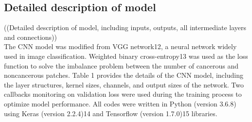 \subsection{Detailed description of model}
((Detailed description of model, including inputs, outputs, all intermediate layers and connections)) \\

The CNN model was modified from VGG network12, a neural network widely used in image classification. Weighted binary cross-entropy13 was used as the loss function to solve the  imbalance problem between the number of cancerous and noncancerous patches. Table 1 provides the details of the CNN model, including the layer structures, kernel sizes, channels, and output sizes of the network.
Two callbacks monitoring on validation loss were used during the training process to optimize model performance. All codes were written in Python (version 3.6.8) using Keras (version 2.2.4)14 and Tensorflow (version 1.7.0)15 libraries.

